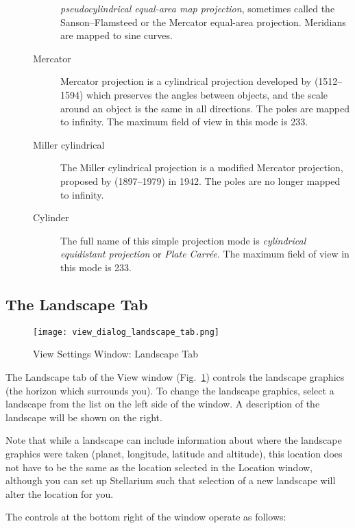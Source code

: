 \begin{description}
\begin{description}
    \emph{pseudocylindrical equal-area map projection}, sometimes
    called the Sanson--Flamsteed or the Mercator equal-area
    projection. Meridians are mapped to sine curves.
  \item[Mercator] Mercator projection is a cylindrical projection developed 
    by  (1512--1594)
    which preserves the angles between objects, and the scale around
    an object is the same in all directions. The poles are mapped to
    infinity.  The maximum field of view in this mode is 233\degree.
  \item[Miller cylindrical] The Miller cylindrical projection is a
    modified Mercator projection, proposed by 
    (1897--1979) in 1942. The poles are no longer mapped to
    infinity.
  \item[Cylinder] The full name of this simple projection mode is
    \emph{cylindrical equidistant projection} or \emph{Plate
      Carr\'ee}. The maximum field of view in this mode is 233\degree.
  \end{description}
\end{description}

\subsection{The Landscape Tab}
\label{sec:gui:view:landscape}

\begin{figure}[t]
\centering\texttt{[image: view\_dialog\_landscape\_tab.png]}
\caption{View Settings Window: Landscape Tab}
\label{fig:gui:view:landscape}
\end{figure}

The Landscape tab of the View window
(Fig.~\ref{fig:gui:view:landscape}) controls the landscape graphics
(the horizon which surrounds you). To change the landscape graphics,
select a landscape from the list on the left side of the window. A
description of the landscape will be shown on the right.

Note that while a landscape  can include information about where the
landscape graphics were taken (planet, longitude, latitude and
altitude), this location does not have to be the same as the location
selected in the Location window, although you can set up Stellarium such
that selection of a new landscape will alter the location for you.

The controls at the bottom right of the window operate as follows:

